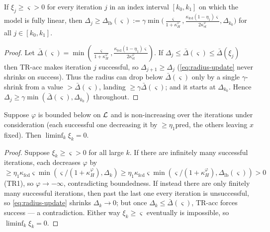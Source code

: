 \begin{lemma}
  \label{lem:tr1}
  If $\xi_j\ge\varsigma>0$ for every iteration $j$ in an index interval $[k_0,k_1]$
  on which the model is fully linear, then $\Delta_j\ge\Delta_{\mathrm{lb}}(\varsigma):=
  \gamma\min\!\bigl(\tfrac{\varsigma}{1+\kappa_H^\varphi},
    \tfrac{\kappa_{\mathrm{fcd}}(1-\eta_1)\varsigma}{2\kappa_{\mathrm{ef}}^\varphi},\Delta_{k_0}\bigr)$
  for all $j\in[k_0,k_1]$.
\end{lemma}
\begin{proof}
  Let $\bar\Delta(\varsigma)=\min(\tfrac{\varsigma}{1+\kappa_H^\varphi},
  \tfrac{\kappa_{\mathrm{fcd}}(1-\eta_1)\varsigma}{2\kappa_{\mathrm{ef}}^\varphi})$. If
  $\Delta_j\le\bar\Delta(\varsigma)\le\bar\Delta(\xi_j)$ then TR-acc makes iteration
  $j$ successful, so $\Delta_{j+1}\ge\Delta_j$ (\eqref{eq:radius-update} never shrinks
  on success). Thus the radius can drop below $\bar\Delta(\varsigma)$ only by a single
  $\gamma$-shrink from a value $>\bar\Delta(\varsigma)$, landing $\ge\gamma\bar\Delta(\varsigma)$;
  and it starts at $\Delta_{k_0}$. Hence $\Delta_j\ge\gamma\min(\bar\Delta(\varsigma),\Delta_{k_0})$
  throughout.
\end{proof}

\begin{lemma}
  \label{lem:tr2}
  Suppose $\varphi$ is bounded below on $\mathcal{L}$ and is non-increasing over the
  iterations under consideration (each successful one decreasing it by $\ge\eta_1\mathrm{pred}$,
  the others leaving $x$ fixed). Then $\liminf_k\xi_k=0$.
\end{lemma}
\begin{proof}
  Suppose $\xi_k\ge\varsigma>0$ for all large $k$. If there are infinitely many
  successful iterations, each decreases $\varphi$ by
  $\ge\eta_1\kappa_{\mathrm{fcd}}\varsigma\min(\varsigma/(1+\kappa_H^\varphi),\Delta_k)
  \ge\eta_1\kappa_{\mathrm{fcd}}\varsigma\min(\varsigma/(1+\kappa_H^\varphi),\Delta_{\mathrm{lb}}(\varsigma))>0$
  (TR1), so $\varphi\to-\infty$, contradicting boundedness. If instead there are only
  finitely many successful iterations, then past the last one every iteration is
  unsuccessful, so \eqref{eq:radius-update} shrinks $\Delta_k\to0$; but once
  $\Delta_k\le\bar\Delta(\varsigma)$, TR-acc forces success --- a contradiction. Either
  way $\xi_k\ge\varsigma$ eventually is impossible, so $\liminf_k\xi_k=0$.
\end{proof}

